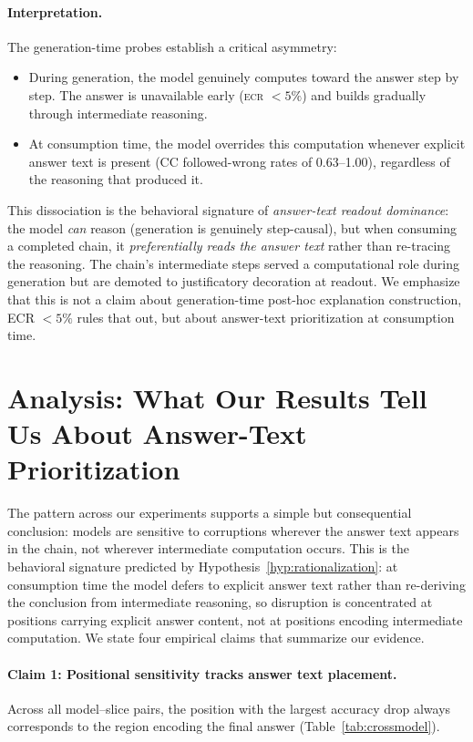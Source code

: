 \documentclass{article}
\theoremstyle{definition}
\theoremstyle{definition}
\newcommand{\CCFW}{0.63}
\newcommand{\SBCCFW}{1.00}
\begin{document}
\paragraph{Interpretation.}
The generation-time probes establish a critical asymmetry:
\begin{itemize}[nosep]
\item During generation, the model genuinely computes toward
  the answer step by step. The answer is unavailable early
  (\textsc{ecr} $< 5\%$) and builds gradually through intermediate
  reasoning.
\item At consumption time, the model overrides this computation
  whenever explicit answer text is present (CC followed-wrong rates of
  \CCFW--\SBCCFW), regardless of the reasoning that produced it.
\end{itemize}
This dissociation is the behavioral signature of \emph{answer-text readout dominance}: the model
\emph{can} reason (generation is genuinely step-causal), but when consuming
a completed chain, it \emph{preferentially reads the answer text} rather
than re-tracing the reasoning. The chain's intermediate steps served
a computational role during generation but are demoted to justificatory
decoration at readout. We emphasize that this is not a claim about generation-time
post-hoc explanation construction, ECR $<5\%$ rules that out, but about answer-text
prioritization at consumption time.

\section{Analysis: What Our Results Tell Us About Answer-Text Prioritization}
\label{sec:analysis}

The pattern across our experiments supports a simple but consequential
conclusion: models are sensitive to corruptions wherever the answer
text appears in the chain, not wherever intermediate computation occurs.
This is the behavioral signature predicted by
Hypothesis~\ref{hyp:rationalization}: at consumption time the model defers
to explicit answer text rather than re-deriving the conclusion from
intermediate reasoning, so disruption is concentrated at positions carrying
explicit answer content, not at positions encoding intermediate computation.
We state four empirical claims that summarize our evidence.

\paragraph{Claim 1: Positional sensitivity tracks answer text placement.}
Across all model--slice pairs, the position with the largest
accuracy drop always corresponds to the region encoding
the final answer (Table~\ref{tab:crossmodel}).
\end{document}
